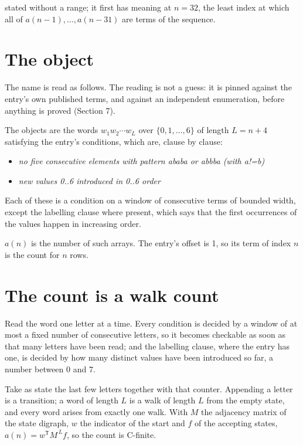 \documentclass[11pt]{article}
\theoremstyle{definition}
\begin{document}
stated without a range; it first has meaning at $n = 32$, the least index at which all of $a(n-1),\dots,a(n-31)$ are terms of the sequence.

\section{The object}

The name is read as follows. The reading is not a guess: it is pinned against the entry's own published terms, and against an independent enumeration, before anything is proved (Section 7).

The objects are the words $w_1 w_2 \cdots w_L$ over $\{0,1,\dots,6\}$ of length $L = n + 4$ satisfying the entry's conditions, which are, clause by clause:

\begin{itemize}

\item {\itshape no five consecutive elements with pattern ababa or abbba (with a!=b)}

\item {\itshape new values 0..6 introduced in 0..6 order}

\end{itemize}

Each of these is a condition on a window of consecutive terms of bounded width, except the labelling clause where present, which says that the first occurrences of the values happen in increasing order.

$a(n)$ is the number of such arrays. The entry's offset is 1, so its term of index $n$ is the count for $n$ rows.

\section{The count is a walk count}

Read the word one letter at a time. Every condition is decided by a window of at most a fixed number of consecutive letters, so it becomes checkable as soon as that many letters have been read; and the labelling clause, where the entry has one, is decided by how many distinct values have been introduced so far, a number between $0$ and 7.

Take as state the last few letters together with that counter. Appending a letter is a transition; a word of length $L$ is a walk of length $L$ from the empty state, and every word arises from exactly one walk. With $M$ the adjacency matrix of the state digraph, $w$ the indicator of the start and $f$ of the accepting states, $a(n) = w^{\mathsf T}M^{\,L}f$, so the count is C-finite.
\end{document}
